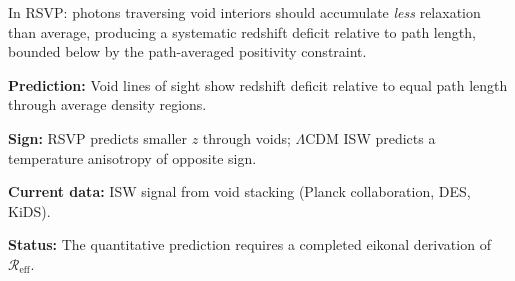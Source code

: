 In RSVP: photons traversing void interiors should accumulate
\emph{less} relaxation than average, producing a systematic
redshift deficit relative to path length, bounded below by the
path-averaged positivity constraint.

\begin{ObsConseq}
  \textbf{Prediction:} Void lines of sight show redshift deficit
  relative to equal path length through average density regions.

  \textbf{Sign:} RSVP predicts smaller $z$ through voids;
  $\Lambda$CDM ISW predicts a temperature anisotropy of
  opposite sign.

  \textbf{Current data:} ISW signal from void stacking
  (Planck collaboration, DES, KiDS).

  \textbf{Status:} \statusopen{}
  The quantitative prediction requires a completed eikonal
  derivation of $\mathcal{R}_{\mathrm{eff}}$.
\end{ObsConseq}
